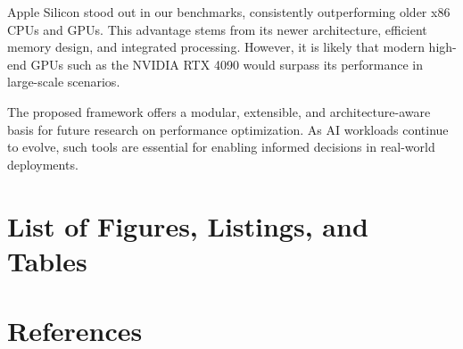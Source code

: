 \documentclass[modern,longauthor]{aastex7}
\begin{document}
Apple Silicon stood out in our benchmarks, consistently outperforming older x86 CPUs and GPUs. This advantage stems from its newer architecture, efficient memory design, and integrated processing. However, it is likely that modern high-end GPUs such as the NVIDIA RTX 4090 would surpass its performance in large-scale scenarios.

The proposed framework offers a modular, extensible, and architecture-aware basis for future research on performance optimization. As AI workloads continue to evolve, such tools are essential for enabling informed decisions in real-world deployments.
\section{List of Figures, Listings, and Tables}
\def\lofname{Figures}
\listoffigures
\def\tocname{Listings}
\lstlistoflistings
\def\lotname{Tables}
\listoftables
\section{References}
\renewcommand{\notesname}{Sources}
\theendnotes
\end{document}
